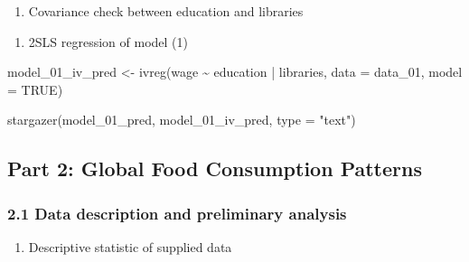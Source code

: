 \documentclass[
  letterpaper,
  DIV=11,
  numbers=noendperiod]{scrartcl}
\newenvironment{Shaded}{\begin{snugshade}}{\end{snugshade}}
\newcommand{\AttributeTok}[1]{\textcolor[rgb]{0.40,0.45,0.13}{#1}}
\newcommand{\ConstantTok}[1]{\textcolor[rgb]{0.56,0.35,0.01}{#1}}
\newcommand{\FunctionTok}[1]{\textcolor[rgb]{0.28,0.35,0.67}{#1}}
\newcommand{\NormalTok}[1]{\textcolor[rgb]{0.00,0.23,0.31}{#1}}
\newcommand{\OtherTok}[1]{\textcolor[rgb]{0.00,0.23,0.31}{#1}}
\newcommand{\SpecialCharTok}[1]{\textcolor[rgb]{0.37,0.37,0.37}{#1}}
\newcommand{\StringTok}[1]{\textcolor[rgb]{0.13,0.47,0.30}{#1}}
\providecommand{\tightlist}{%
  \setlength{\itemsep}{0pt}\setlength{\parskip}{0pt}}\usepackage{longtable,booktabs,array}
\begin{document}
\begin{enumerate}
\def\labelenumi{\arabic{enumi}.}
\setcounter{enumi}{1}
\tightlist
\item
  Covariance check between education and libraries
\end{enumerate}

\begin{Shaded}
\end{Shaded}

\begin{enumerate}
\def\labelenumi{\arabic{enumi}.}
\setcounter{enumi}{2}
\tightlist
\item
  2SLS regression of model (1)
\end{enumerate}

\begin{Shaded}
\begin{Highlighting}[]
\NormalTok{model\_01\_iv\_pred }\OtherTok{\textless{}{-}} \FunctionTok{ivreg}\NormalTok{(wage }\SpecialCharTok{\textasciitilde{}}\NormalTok{ education }\SpecialCharTok{|}\NormalTok{ libraries,}
                               \AttributeTok{data =}\NormalTok{ data\_01, }
                               \AttributeTok{model =} \ConstantTok{TRUE}\NormalTok{)}


\FunctionTok{stargazer}\NormalTok{(model\_01\_pred, model\_01\_iv\_pred, }\AttributeTok{type =} \StringTok{"text"}\NormalTok{)}
\end{Highlighting}
\end{Shaded}

\hypertarget{part-2-global-food-consumption-patterns}{%
\subsection{Part 2: Global Food Consumption
Patterns}\label{part-2-global-food-consumption-patterns}}

\hypertarget{data-description-and-preliminary-analysis}{%
\subsubsection{2.1 Data description and preliminary
analysis}\label{data-description-and-preliminary-analysis}}

\begin{enumerate}
\def\labelenumi{\arabic{enumi}.}
\tightlist
\item
  Descriptive statistic of supplied data
\end{enumerate}
\end{document}
